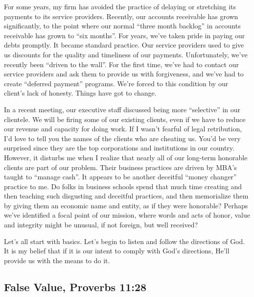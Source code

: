 \documentclass[12pt]{memoir}
\begin{document}
For some years, my firm has avoided the practice of delaying or stretching
its payments to its service providers. Recently, our accounts receivable
has grown significantly, to the point where our normal ``three month
backlog'' in accounts receivable has grown to ``six months''. For
years, we've taken pride in paying our debts promptly. It became standard
practice. Our service providers used to give us discounts for the
quality and timeliness of our payments. Unfortunately, we've recently
been ``driven to the wall''. For the first time, we've had to contact
our service providers and ask them to provide us with forgiveness,
and we've had to create ``deferred payment'' programs. We're forced
to this condition by our client's lack of honesty. Things have got
to change.

In a recent meeting, our executive staff discussed being more ``selective''
in our clientele. We will be firing some of our existing clients,
even if we have to reduce our revenue and capacity for doing work.
If I wasn't fearful of legal retribution, I'd love to tell you the
names of the clients who are cheating us. You'd be very surprised
since they are the top corporations and institutions in our country.
However, it disturbs me when I realize that nearly all of our long-term
honorable clients are part of our problem. Their business practices
are driven by MBA's taught to ``manage cash''. It appears to be
another deceitful ``money changer'' practice to me. Do folks in
business schools spend that much time creating and then teaching such
disgusting and deceitful practices, and then memorialize them by giving
them an economic name and entity, as if they were honorable? Perhaps
we've identified a focal point of our mission, where words and acts
of honor, value and integrity might be unusual, if not foreign, but
well received? 

Let's all start with basics. Let's begin to listen and follow the
directions of God. It is my belief that if it is our intent to comply
with God's directions, He'll provide us with the means to do it.

\subsection{False Value, Proverbs 11:28}
\end{document}
